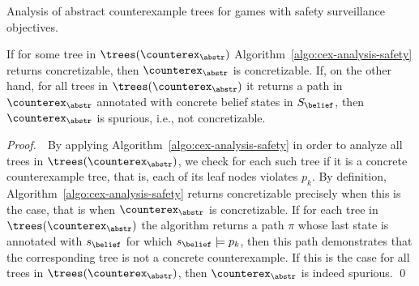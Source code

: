 \begin{algorithm}[h!]
{}

\smallskip

%
{\KwRet{$\pi$;}}
{}

\smallskip
\bigskip

\caption{Analysis of abstract counterexample trees for games with safety surveillance objectives.}
\label{algo:cex-analysis-safety}
\end{algorithm}

\bigskip

\begin{theorem}
If for some tree in $\trees(\counterex_\abstr)$ Algorithm~\ref{algo:cex-analysis-safety} returns {\sc concretizable}, then $\counterex_\abstr$ is concretizable. If, on the other hand, for all trees in $\trees(\counterex_\abstr)$ it returns a path in $\counterex_\abstr$ annotated with concrete belief states in $S_\belief$, then $\counterex_\abstr$ is spurious, i.e., not concretizable.
\end{theorem}
{\it Proof.}\ \ 
By applying Algorithm~\ref{algo:cex-analysis-safety} in order to analyze all trees in $\trees(\counterex_\abstr)$, we check for each such tree if it is a concrete counterexample tree, that is, each of its leaf nodes violates $p_k$. By definition, Algorithm~\ref{algo:cex-analysis-safety} returns {\sc concretizable} precisely when this is the case, that is when $\counterex_\abstr$ is concretizable. If for each tree in $\trees(\counterex_\abstr)$ the algorithm returns a path $\pi$ whose last state is annotated with $s_\belief$ for which $s_\belief \models p_k$, then this path demonstrates that the corresponding tree is not a concrete counterexample. If this is the case for all trees in $\trees(\counterex_\abstr)$, then $\counterex_\abstr$ is indeed spurious.
\qed

